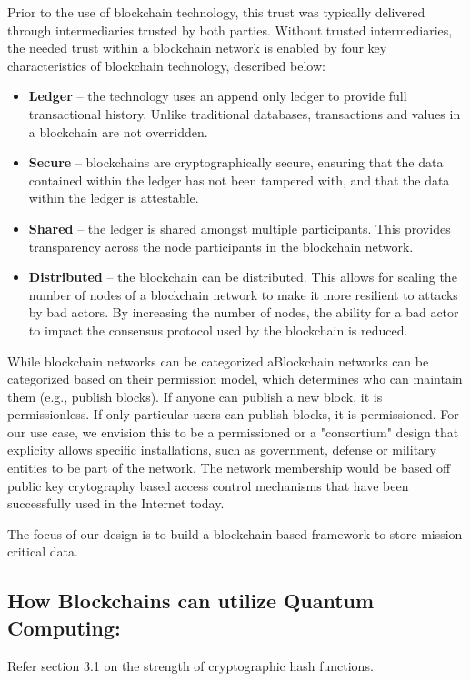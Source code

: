  Prior to the use of blockchain
technology, this trust was typically delivered through intermediaries trusted by both parties.
Without trusted intermediaries, the needed trust within a blockchain network is enabled by four
key characteristics of blockchain technology, described below:
\begin{itemize}
\item {\bf Ledger} – the technology uses an append only ledger to provide full transactional history.
Unlike traditional databases, transactions and values in a blockchain are not overridden.
\item {\bf Secure} – blockchains are cryptographically secure, ensuring that the data contained
within the ledger has not been tampered with, and that the data within the ledger is
attestable.
\item {\bf Shared} – the ledger is shared amongst multiple participants. This provides transparency
across the node participants in the blockchain network.
\item {\bf Distributed} – the blockchain can be distributed. This allows for scaling the number of
nodes of a blockchain network to make it more resilient to attacks by bad actors. By
increasing the number of nodes, the ability for a bad actor to impact the consensus
protocol used by the blockchain is reduced.
\end{itemize}

While blockchain networks can be categorized aBlockchain networks can be categorized based on their permission model, which determines who
can maintain them (e.g., publish blocks). If anyone can publish a new block, it is permissionless.
If only particular users can publish blocks, it is permissioned. For our use case, we envision this to be a permissioned or a
"consortium" design that explicity allows specific installations, such as government, defense or military entities to be part of the network.
The network membership would be based off public key crytography based access control mechanisms that have been successfully used in the 
Internet today.

The focus of our design is to build a blockchain-based framework to store mission critical data.

\subsection{How Blockchains can utilize Quantum Computing:}


Refer section 3.1 on the strength of cryptographic hash functions.


